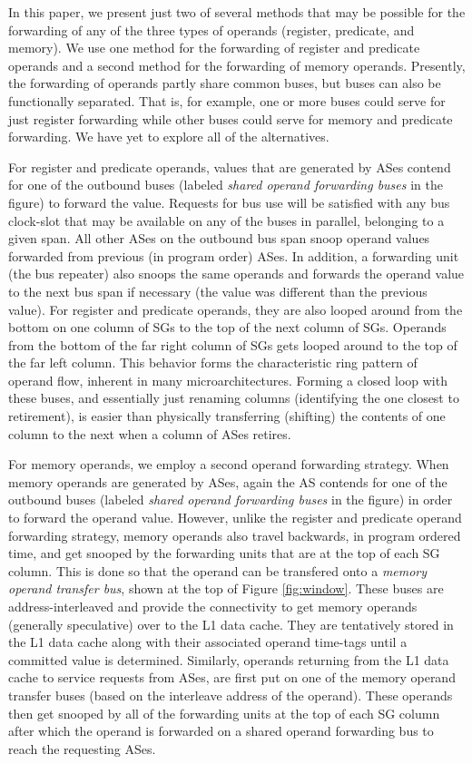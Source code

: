 \documentclass[10pt,dvips]{article}
\begin{document}
In this paper, we present just two of several methods that
may be possible for the forwarding of any of the three types of
operands (register, predicate, and memory).
We use one method for the forwarding of register and predicate
operands and a second method for the forwarding of memory 
operands.  Presently, the forwarding of operands partly share common
buses,
but buses can also be functionally separated.  
That is, for example, one or more buses could serve for
just register
forwarding while other buses could serve for memory and predicate forwarding.
We have yet to explore all of the alternatives.

For register and predicate operands, values that are generated
by ASes contend for one of the outbound buses
(labeled \textit{shared operand forwarding buses} in the figure) 
to forward the value.
Requests for bus use will be satisfied with any bus clock-slot that may be
available on any of the buses in parallel, belonging to
a given span.  All other ASes on the outbound bus span snoop
operand values forwarded from previous (in program order)
ASes.  In addition, a forwarding unit (the bus repeater) also
snoops the same operands and forwards the operand value to the
next bus span if necessary (the value was different than the previous
value).  For register and predicate operands, they are also
looped around from the bottom on one column of SGs
to the top of the next column of SGs.  
Operands from the bottom of the
far right column of SGs gets looped around to the
top of the far left column.  
This behavior forms the characteristic ring pattern of operand flow,
inherent in many microarchitectures.  Forming a closed loop
with these buses, and essentially just renaming columns (identifying the
one closest to retirement), is easier than physically transferring
(shifting) the contents of one column to the next when a column
of ASes retires.

For memory operands, we employ a second operand forwarding strategy.
When memory operands are generated by ASes, again the AS contends
for one of the outbound buses 
(labeled \textit{shared operand forwarding buses} in the figure) 
in order to forward the operand value.
However, unlike the register and predicate operand forwarding
strategy, memory operands also travel backwards, in program ordered
time, and get snooped by the forwarding units that are at the top
of each SG column.  This is done so that the operand can
be transfered onto a \textit{memory operand transfer bus}, shown
at the top of Figure \ref{fig:window}.  
These buses are address-interleaved and
provide the connectivity to get memory operands (generally
speculative) over to the L1 data cache.
They are tentatively stored in the L1 data cache along with 
their associated operand
time-tags until a committed value is determined.
Similarly, operands returning from the L1 data cache to service requests
from ASes, are first put on one of the memory operand transfer buses (based
on the interleave address of the operand).  These operands then get snooped
by all of the forwarding units at the top of each SG
column after which the operand is forwarded on a shared operand
forwarding bus to reach the requesting ASes.
\end{document}
